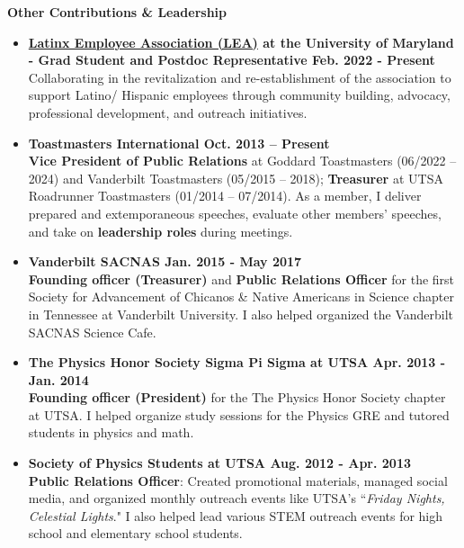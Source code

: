 \documentclass[letter,12pt]{article}
\begin{document}
\noindent
\vspace{-3mm}
{\bf Other Contributions \& Leadership} \\
\vspace{-13mm}
\begin{center}
\end{center}
\vspace{-3mm}
\begin{itemize}
    \item \textbf{\href{https://umdlatino.wordpress.com/about/board-members/}{Latinx Employee Association (LEA)} at the University of Maryland - Grad Student and Postdoc Representative \hfill Feb. 2022 - Present} \\
    Collaborating in the revitalization and re-establishment of the association to support Latino/ Hispanic employees through community building, advocacy, professional development, and outreach initiatives.
    \item \textbf{Toastmasters International \hfill Oct. 2013 – Present} \\
    \textbf{Vice President of Public Relations} at Goddard Toastmasters (06/2022 – 2024) and Vanderbilt Toastmasters (05/2015 – 2018); \textbf{Treasurer} at UTSA Roadrunner Toastmasters (01/2014 – 07/2014). As a member, I deliver prepared and extemporaneous speeches, evaluate other members’ speeches, and take on \textbf{leadership roles} during meetings.
    \item \textbf{Vanderbilt SACNAS \hfill Jan. 2015 - May 2017} \\
    \textbf{Founding officer (Treasurer)} and \textbf{Public Relations Officer} for the first Society for Advancement of Chicanos \& Native Americans in Science chapter in Tennessee at Vanderbilt University. I also helped organized the Vanderbilt SACNAS Science Cafe.
    \item \textbf{The Physics Honor Society \text{\textbar} Sigma Pi Sigma at UTSA \hfill Apr. 2013 - Jan. 2014} \\
    \textbf{Founding officer (President)} for the The Physics Honor Society chapter at UTSA. I helped organize study sessions for the Physics GRE and tutored students in physics and math.
    \item \textbf{Society of Physics Students at UTSA \hfill Aug. 2012 - Apr. 2013} \\
    \textbf{Public Relations Officer}: Created promotional materials, managed social media, and organized monthly outreach events like UTSA’s “\textit{Friday Nights, Celestial Lights}." I also helped lead various STEM outreach events for high school and elementary school students.
\end{itemize}
\end{document}
